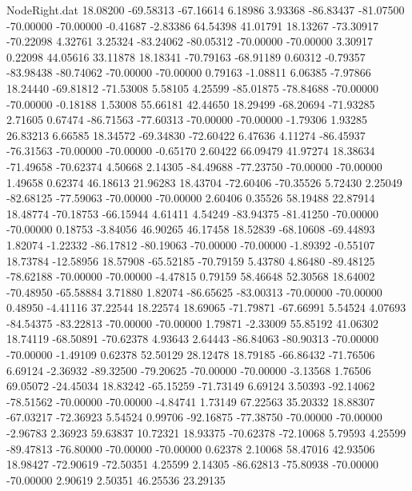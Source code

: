 \begin{filecontents}{NodeRight.dat}
  18.08200  -69.58313  -67.16614     6.18986    3.93368  -86.83437  -81.07500  -70.00000  -70.00000   -0.41687   -2.83386   64.54398   41.01791
  18.13267  -73.30917  -70.22098     4.32761    3.25324  -83.24062  -80.05312  -70.00000  -70.00000    3.30917    0.22098   44.05616   33.11878
  18.18341  -70.79163  -68.91189     0.60312   -0.79357  -83.98438  -80.74062  -70.00000  -70.00000    0.79163   -1.08811    6.06385   -7.97866
  18.24440  -69.81812  -71.53008     5.58105    4.25599  -85.01875  -78.84688  -70.00000  -70.00000   -0.18188    1.53008   55.66181   42.44650
  18.29499  -68.20694  -71.93285     2.71605    0.67474  -86.71563  -77.60313  -70.00000  -70.00000   -1.79306    1.93285   26.83213    6.66585
  18.34572  -69.34830  -72.60422     6.47636    4.11274  -86.45937  -76.31563  -70.00000  -70.00000   -0.65170    2.60422   66.09479   41.97274
  18.38634  -71.49658  -70.62374     4.50668    2.14305  -84.49688  -77.23750  -70.00000  -70.00000    1.49658    0.62374   46.18613   21.96283
  18.43704  -72.60406  -70.35526     5.72430    2.25049  -82.68125  -77.59063  -70.00000  -70.00000    2.60406    0.35526   58.19488   22.87914
  18.48774  -70.18753  -66.15944     4.61411    4.54249  -83.94375  -81.41250  -70.00000  -70.00000    0.18753   -3.84056   46.90265   46.17458
  18.52839  -68.10608  -69.44893     1.82074   -1.22332  -86.17812  -80.19063  -70.00000  -70.00000   -1.89392   -0.55107   18.73784  -12.58956
  18.57908  -65.52185  -70.79159     5.43780    4.86480  -89.48125  -78.62188  -70.00000  -70.00000   -4.47815    0.79159   58.46648   52.30568
  18.64002  -70.48950  -65.58884     3.71880    1.82074  -86.65625  -83.00313  -70.00000  -70.00000    0.48950   -4.41116   37.22544   18.22574
  18.69065  -71.79871  -67.66991     5.54524    4.07693  -84.54375  -83.22813  -70.00000  -70.00000    1.79871   -2.33009   55.85192   41.06302
  18.74119  -68.50891  -70.62378     4.93643    2.64443  -86.84063  -80.90313  -70.00000  -70.00000   -1.49109    0.62378   52.50129   28.12478
  18.79185  -66.86432  -71.76506     6.69124   -2.36932  -89.32500  -79.20625  -70.00000  -70.00000   -3.13568    1.76506   69.05072  -24.45034
  18.83242  -65.15259  -71.73149     6.69124    3.50393  -92.14062  -78.51562  -70.00000  -70.00000   -4.84741    1.73149   67.22563   35.20332
  18.88307  -67.03217  -72.36923     5.54524    0.99706  -92.16875  -77.38750  -70.00000  -70.00000   -2.96783    2.36923   59.63837   10.72321
  18.93375  -70.62378  -72.10068     5.79593    4.25599  -89.47813  -76.80000  -70.00000  -70.00000    0.62378    2.10068   58.47016   42.93506
  18.98427  -72.90619  -72.50351     4.25599    2.14305  -86.62813  -75.80938  -70.00000  -70.00000    2.90619    2.50351   46.25536   23.29135

\end{filecontents}
